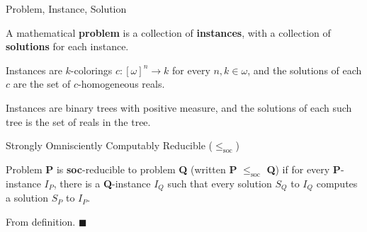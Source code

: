 \begin{frame}{Problem, Instance, Solution}
  \begin{define*}
    A mathematical \textbf{problem} is a collection of \textbf{instances},
    with a collection of \textbf{solutions} for each instance.
  \end{define*}

  \vspace{2em}
  \begin{example*}[RT is a problem]
    Instances are $k$-colorings $c:[\omega]^n\rightarrow k$ for every
    $n,k\in\omega$, and the solutions of each $c$ are the set of
    $c$-homogeneous reals.
  \end{example*}

  \vspace{2em}
  \begin{example*}
    Instances are binary trees with positive measure, and the solutions of
    each such tree is the set of reals in the tree.
  \end{example*}
\end{frame}

\begin{frame}{Strongly Omnisciently Computably Reducible
($\leq_{\text{soc}}$)}
  \begin{define*}
    Problem \textbf{P} is \textbf{soc}-reducible to problem \textbf{Q}
    (written \textbf{P} $\leq_{\text{soc}}$ \textbf{Q}) if for every
    \textbf{P}-instance $I_P$, there is a \textbf{Q}-instance
    $I_Q$ such that every solution $S_{Q}$ to $I_Q$ computes a
    solution $S_P$ to $I_P$.
  \end{define*}

  \begin{observe*}
    From definition. $\blacksquare$
  \end{observe*}

  \begin{center}
  \end{center}
\end{frame}

